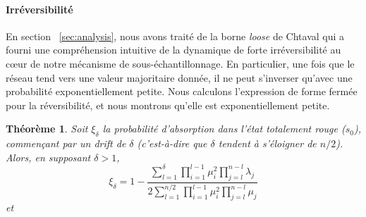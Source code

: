 \documentclass[letterpaper,twocolumn,10pt]{article}
\newcommand\ddfrac[2]{\frac{\displaystyle #1}{\displaystyle #2}}
\newtheorem{theorem}{Théorème}
\theoremstyle{definition}
\begin{document}
\begin{appendices}
\paragraph{Irréversibilité}
En section ~\ref{sec:analysis}, nous avons traité de la borne \emph{loose} %
de Chtaval qui a fourni une compréhension intuitive de la dynamique de forte irréversibilité au cœur de notre mécanisme de sous-échantillonnage. En particulier, une fois que le réseau tend vers une valeur majoritaire donnée, il ne peut s'inverser qu'avec une probabilité exponentiellement petite. Nous calculons l'expression de forme fermée pour la réversibilité, et nous montrons qu'elle est exponentiellement petite.
\begin{theorem}
\label{theorem:slush_prob_convergence_minority}
Soit $\xi_\delta$ la probabilité d'absorption dans l'état totalement rouge ($s_0$), commençant par un drift de $\delta$ (c'est-à-dire que $\delta$ tendent à s'éloigner de $n/2$). Alors, en supposant $\delta > 1$,
\begin{equation}
\xi_\delta = 1 - \ddfrac{\sum_{l = 1}^{\delta} \prod_{i = 1}^{l-1} \mu_i^2 \prod_{j = l}^{n-l}\lambda_j}{2\sum_{l = 1}^{n/2}\prod_{i=1}^{l-1}\mu_i^2\prod_{j=l}^{n-l}\mu_j}
\end{equation}
et
\begin{equation}

\end{equation}
\end{theorem}
\end{appendices}
\end{document}
